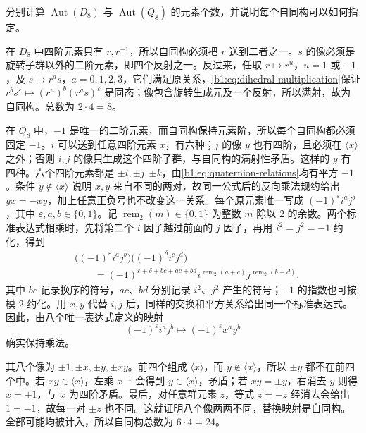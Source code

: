 \begin{exercise}\label{b1:ex:03-small-automorphisms}
	分别计算 \(\operatorname{Aut}(D_8)\) 与 \(\operatorname{Aut}(Q_8)\) 的元素个数，并说明每个自同构可以如何指定。
\end{exercise}
\begin{solution}
	在 \(D_8\) 中四阶元素只有 \(r,r^{-1}\)，所以自同构必须把 \(r\) 送到二者之一。\(s\) 的像必须是旋转子群以外的二阶元素，即四个反射之一。反过来，任取 \(r\mapsto r^u\)，\(u=1\) 或 \(-1\)，及 \(s\mapsto r^as\)，\(a=0,1,2,3\)，它们满足原关系，\eqref{b1:eq:dihedral-multiplication}保证 \(r^bs^\varepsilon\mapsto(r^u)^b(r^as)^\varepsilon\) 是同态；像包含旋转生成元及一个反射，所以满射，故为自同构。总数为 \(2\cdot4=8\)。

	在 \(Q_8\) 中，\(-1\) 是唯一的二阶元素，而自同构保持元素阶，所以每个自同构都必须固定 \(-1\)。\(i\) 可以送到任意四阶元素 \(x\)，有六种；\(j\) 的像 \(y\) 也有四阶，且必须在 \(\langle x\rangle\) 之外；否则 \(i,j\) 的像只生成这个四阶子群，与自同构的满射性矛盾。这样的 \(y\) 有四种。六个四阶元素都是 \(\pm i,\pm j,\pm k\)，由\eqref{b1:eq:quaternion-relations}均有平方 \(-1\)。条件 \(y\notin\langle x\rangle\) 说明 \(x,y\) 来自不同的两对，故同一公式后的反向乘法规约给出 \(yx=-xy\)，加上任意正负号也不改变这一关系。每个原元素唯一写成 \((-1)^\varepsilon i^aj^b\)，其中 \(\varepsilon,a,b\in\{0,1\}\)。记 \(\operatorname{rem}_2(m)\in\{0,1\}\) 为整数 \(m\) 除以 \(2\) 的余数。两个标准表达式相乘时，先将第二个 \(i\) 因子越过前面的 \(j\) 因子，再用 \(i^2=j^2=-1\) 约化，得到
	\[
		\begin{aligned}
			&\bigl((-1)^\varepsilon i^aj^b\bigr) \bigl((-1)^\delta i^cj^d\bigr)\\
			&\qquad=(-1)^{\varepsilon+\delta+bc+ac+bd} i^{\operatorname{rem}_2(a+c)}j^{\operatorname{rem}_2(b+d)}.
		\end{aligned}
	\]
	其中 \(bc\) 记录换序的符号，\(ac\)、\(bd\) 分别记录 \(i^2\)、\(j^2\) 产生的符号；\(-1\) 的指数也可按模 \(2\) 约化。用 \(x,y\) 代替 \(i,j\) 后，同样的交换和平方关系给出同一个标准表达式。因此，由八个唯一表达式定义的映射
	\[
		(-1)^\varepsilon i^aj^b\longmapsto(-1)^\varepsilon x^ay^b
	\]
	确实保持乘法。

	其八个像为 \(\pm1,\pm x,\pm y,\pm xy\)。前四个组成 \(\langle x\rangle\)，而 \(y\notin\langle x\rangle\)，所以 \(\pm y\) 都不在前四个中。若 \(xy\in\langle x\rangle\)，左乘 \(x^{-1}\) 会得到 \(y\in\langle x\rangle\)，矛盾；若 \(xy=\pm y\)，右消去 \(y\) 则得 \(x=\pm1\)，与 \(x\) 为四阶矛盾。最后，对任意群元素 \(z\)，等式 \(z=-z\) 经消去会给出 \(1=-1\)，故每一对 \(\pm z\) 也不同。这就证明八个像两两不同，替换映射是自同构。全部可能均被计入，所以自同构总数为 \(6\cdot4=24\)。
\end{solution}

